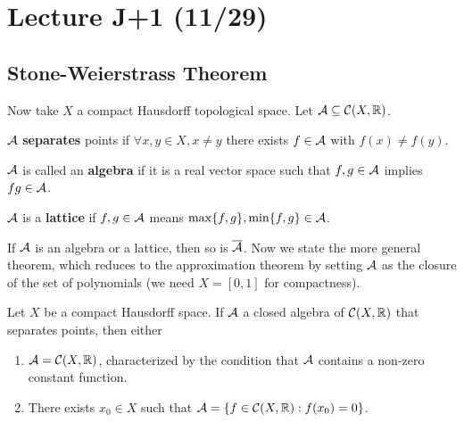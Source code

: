 \section{Lecture J+1 (11/29)}
\subsection{Stone-Weierstrass Theorem}

Now take $X$ a compact Hausdorff topological space.
Let $\mathcal{A} \subseteq \mathcal{C}(X, \operatorname{\mathbb{R}})$.

\begin{definition}
$\mathcal{A}$
\textbf{separates} points if $\forall x, y \in X, x \neq y$ there exists $f \in \mathcal{A}$
with $f(x) \neq f(y)$. 
\end{definition}

\begin{definition}
$\mathcal{A}$ is called an \textbf{algebra}
if it is a real vector space
such that $f, g \in \mathcal{A}$ implies $fg \in \mathcal{A}$.
\end{definition}

\begin{definition}
    $\mathcal{A}$ is a \textbf{lattice} if $f, g \in \mathcal{A}$ means $\max\{f, g\}, \min\{f, g\} \in \mathcal{A}$.
\end{definition}
If $\mathcal{A}$ is an algebra or a lattice, then so is $\overline{\mathcal{A}}$.
Now we state the more general theorem, which reduces to the
approximation theorem by setting $\mathcal{A}$ as the closure of the set of polynomials
(we need $X = [0, 1]$ for compactness).
\begin{theorem}
    Let $X$ be a compact Hausdorff space. If $\mathcal{A}$ a closed algebra of $\mathcal{C}(X, \operatorname{\mathbb{R}})$
    that separates points, then either
    \begin{enumerate}
        \item $\mathcal{A} = \mathcal{C}(X, \operatorname{\mathbb{R}})$, characterized by the condition that $\mathcal{A}$ contains a
        non-zero constant function.
        \item There exists $x_0 \in X$ such that $\mathcal{A} = \{ f \in \mathcal{C}(X, \operatorname{\mathbb{R}}) : f(x_0) = 0\}$.
    \end{enumerate}
\end{theorem}

